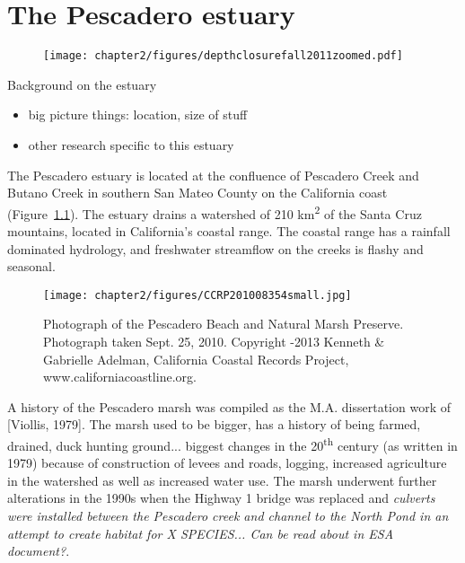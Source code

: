 \chapter{The Pescadero estuary} \label{chPescadero}


% 
\begin{figure}
\texttt{[image: chapter2/figures/depthclosurefall2011zoomed.pdf]} \end{figure}

Background on the estuary

\begin{itemize} \item  big picture things: location, size of stuff \item
other research specific to this estuary \end{itemize}

The Pescadero estuary is located at the confluence of Pescadero Creek
and Butano Creek in southern San Mateo County on the California coast (Figure~\ref{fig:ccrp_2010}).
The estuary drains a watershed of 210 km\textsuperscript{2} of the Santa
Cruz mountains, located in California's coastal range. The coastal range
has a rainfall dominated hydrology, and freshwater streamflow on the
creeks is flashy and seasonal.


% 
\begin{figure}
\texttt{[image: chapter2/figures/CCRP201008354small.jpg]} \caption{Photograph of the Pescadero Beach and Natural Marsh Preserve. Photograph taken Sept. 25,
2010. Copyright -2013 Kenneth \& Gabrielle
Adelman, California Coastal Records Project,
www.californiacoastline.org.} \label{fig:ccrp_2010} \end{figure}


A history of the Pescadero marsh was compiled as
the M.A. dissertation work of [Viollis, 1979]. The marsh used to be
bigger, has a history of being farmed, drained, duck hunting ground...
biggest changes in the 20\textsuperscript{th} century (as written in
1979) because of construction of levees and roads, logging, increased
agriculture in the watershed as well as increased water use. The marsh underwent further alterations in the 1990s when the Highway 1 bridge was replaced and \emph{culverts were installed between the Pescadero creek and channel to the North Pond in an attempt to create habitat for X SPECIES... Can be read about in ESA document?}.

